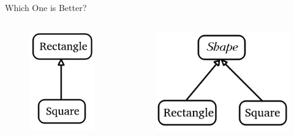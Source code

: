 \documentclass{beamer}
\begin{document}
\begin{frame}{Which One is Better?}
    \begin{columns}
        \begin{column}{0.5\linewidth}
            \begin{figure}[h]
                \centering
                \includegraphics[scale=0.6]{img/shape_original.png}
            \end{figure}
        \end{column}
        \begin{column}{0.5\linewidth}
            \begin{figure}[h]
                \centering
                \includegraphics[scale=0.6]{img/shape_new.png}
            \end{figure}
        \end{column}
    \end{columns}
\end{frame}
\end{document}

